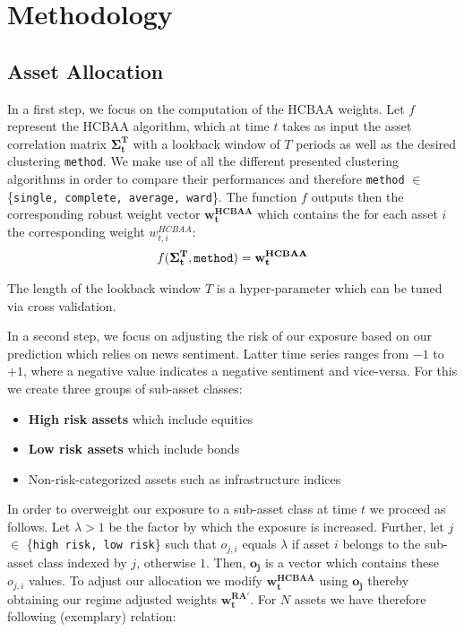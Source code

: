 \section{Methodology}

\subsection{Asset Allocation}

In a first step, we focus on the computation of the HCBAA weights. Let $f$ represent the HCBAA algorithm, which at time $t$ takes as input the asset correlation matrix $\mathbf{\Sigma_t^T}$ with a lookback window of $T$ periods as well as the desired clustering \texttt{method}. We make use of all the different presented clustering algorithms in order to compare their performances and therefore \texttt{method} $\in$ \{\texttt{single, complete, average, ward}\}. The function $f$ outputs then the corresponding robust weight vector $\mathbf{w_t^{HCBAA}}$ which contains the for each asset $i$ the corresponding weight $w_{t,i}^{HCBAA}$:
\begin{align}
    f(\mathbf{\Sigma_t^T}, \text{\texttt{method}}) = \mathbf{w_t^{HCBAA}}
\end{align}

The length of the lookback window $T$ is a hyper-parameter which can be tuned via cross validation. 

In a second step, we focus on adjusting the risk of our exposure based on our prediction which relies on news sentiment. Latter time series ranges from $-1$ to $+1$, where a negative value indicates a negative sentiment and vice-versa. For this we create three groups of sub-asset classes: 

\begin{itemize}
    \item \textbf{High risk assets} which include equities
    \item \textbf{Low risk assets} which include bonds
    \item Non-risk-categorized assets such as infrastructure indices
\end{itemize}{}

In order to overweight our exposure to a sub-asset class at time $t$ we proceed as follows. Let $\lambda > 1$ be the factor by which the exposure is  increased. Further, let $j$ $\in$ \{\texttt{high risk, low risk}\} such that $o_{j,i}$ equals $\lambda$ if asset $i$ belongs to the sub-asset class indexed by $j$, otherwise $1$. Then, $\mathbf{o_j}$ is a vector which contains these $o_{j,i}$ values.  To adjust our allocation we modify $\mathbf{w_t^{HCBAA}}$ using $\mathbf{o_j}$ thereby obtaining our regime adjusted weights $\mathbf{w_t^{RA'}}$. For $N$ assets we have therefore following (exemplary) relation:

